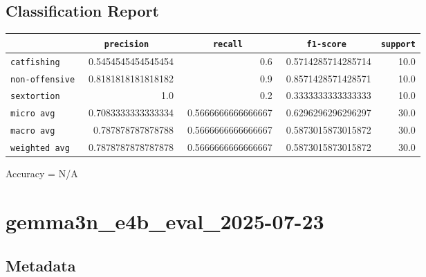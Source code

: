 \documentclass{article}
\begin{document}
\subsection{Classification Report}

\begin{center}
\begin{tabular}{l | r | r | r | r} \hline
    \verb|            | & \verb|    precision     | & \verb|      recall      | & \verb|     f1-score     | & \verb|support| \\ \hline
    \hline
    \verb|catfishing | & 0.5454545454545454 & 0.6 & 0.5714285714285714 &    10.0 \\ \hline
    \verb|non-offensive| & 0.8181818181818182 & 0.9 & 0.8571428571428571 &    10.0 \\ \hline
    \verb|sextortion | & 1.0 & 0.2 & 0.3333333333333333 &    10.0 \\ \hline
    \verb|micro avg  | & 0.7083333333333334 & 0.5666666666666667 & 0.6296296296296297 &    30.0 \\ \hline
    \verb|macro avg  | & 0.787878787878788 & 0.5666666666666667 & 0.5873015873015872 &    30.0 \\ \hline
    \verb|weighted avg| & 0.7878787878787878 & 0.5666666666666667 & 0.5873015873015872 &    30.0 \\ \hline
\end{tabular}
\end{center}

\begin{center}
Accuracy = N/A
\end{center}

\section{gemma3n\_e4b\_eval\_2025-07-23}
\subsection{Metadata}
\end{document}
